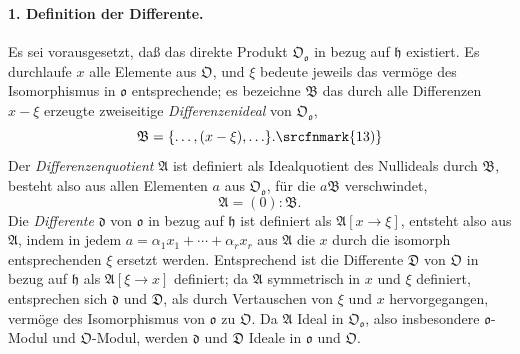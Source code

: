 \paragraph{1. Definition der Differente.}
Es sei vorausgesetzt, daß das direkte Produkt $\mathfrak O_{\mathfrak o}$ in bezug auf $\mathfrak h$ existiert. Es durchlaufe $x$ alle Elemente aus $\mathfrak O$, und $\xi$ bedeute jeweils das vermöge des Isomorphismus in $\mathfrak o$ entsprechende; es bezeichne $\mathfrak B$ das durch alle Differenzen $x-\xi$ erzeugte zweiseitige \emph{Differenzenideal} von $\mathfrak O_{\mathfrak o}$,
\[
\mathfrak B=\{\ldots,(x-\xi),\ldots\}.\srcfnmark{13)}
\]
Der \emph{Differenzenquotient} $\mathfrak A$ ist definiert als Idealquotient des Nullideals durch $\mathfrak B$, besteht also aus allen Elementen $a$ aus $\mathfrak O_{\mathfrak o}$, für die $a\mathfrak B$ verschwindet,
\[
\mathfrak A=(0):\mathfrak B.
\]
Die \emph{Differente} $\mathfrak d$ von $\mathfrak o$ in bezug auf $\mathfrak h$ ist definiert als $\mathfrak A[x\to\xi]$, entsteht also aus $\mathfrak A$, indem in jedem $a=\alpha_1x_1+\cdots+\alpha_rx_r$ aus $\mathfrak A$ die $x$ durch die isomorph entsprechenden $\xi$ ersetzt werden. Entsprechend ist die Differente $\mathfrak D$ von $\mathfrak O$ in bezug auf $\mathfrak h$ als $\mathfrak A[\xi\to x]$ definiert; da $\mathfrak A$ symmetrisch in $x$ und $\xi$ definiert, entsprechen sich $\mathfrak d$ und $\mathfrak D$, als durch Vertauschen von $\xi$ und $x$ hervorgegangen, vermöge des Isomorphismus von $\mathfrak o$ zu $\mathfrak O$. Da $\mathfrak A$ Ideal in $\mathfrak O_{\mathfrak o}$, also insbesondere $\mathfrak o$-Modul und $\mathfrak O$-Modul, werden $\mathfrak d$ und $\mathfrak D$ Ideale in $\mathfrak o$ und $\mathfrak O$.


